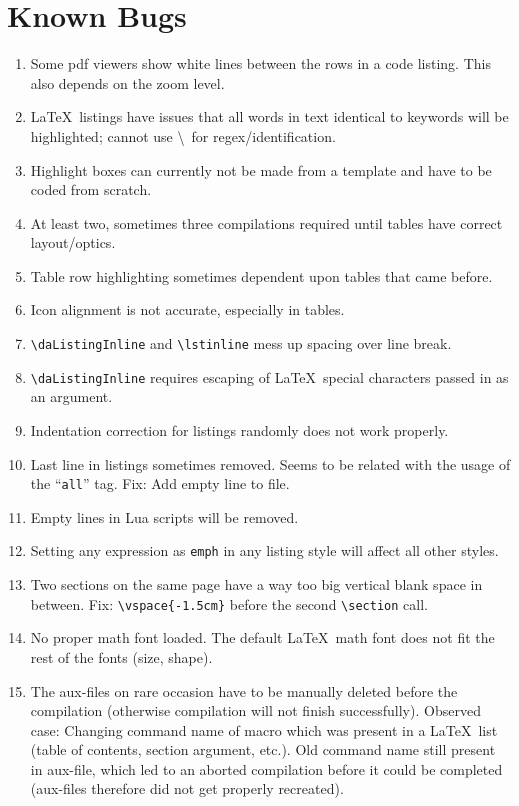 \chapter{Known Bugs}
	\lstset{style=LaTeX}
	\begin{enumerate}
		\item Some pdf viewers show white lines between the rows in a code listing. This also depends on the zoom level. %
		\item \LaTeX~listings have issues that all words in text identical to keywords will be highlighted; cannot use \textbackslash~for regex/identification.
		\item Highlight boxes can currently not be made from a template and have to be coded from scratch.
		\item At least two, sometimes three compilations required until tables have correct layout/optics.
		\item Table row highlighting sometimes dependent upon tables that came before.
		\item Icon alignment is not accurate, especially in tables.
		\item \lstinline{\daListingInline} and \lstinline{\lstinline} mess up spacing over line break.
		\item \lstinline{\daListingInline} requires escaping of \LaTeX~special characters passed in as an argument.
		\item Indentation correction for listings randomly does not work properly.
		\item Last line in listings sometimes removed. Seems to be related with the usage of the \enquote{\lstinline$all$} tag. Fix: Add empty line to file. %
		\item Empty lines in Lua scripts will be removed.
		\item Setting any expression as \lstinline$emph$ in any listing style will affect all other styles.
		\item Two sections on the same page have a way too big vertical blank space in between. Fix: \lstinline$\vspace{-1.5cm}$ before the second \lstinline{\section} call.
		\item No proper math font loaded. The default \LaTeX~math font does not fit the rest of the fonts (size, shape).
		\item The aux-files on rare occasion have to be manually deleted before the compilation (otherwise compilation will not finish successfully). Observed case: Changing command name of macro which was present in a \LaTeX~list (table of contents, section argument, etc.). Old command name still present in aux-file, which led to an aborted compilation before it could be completed (aux-files therefore did not get properly recreated).
	\end{enumerate}
